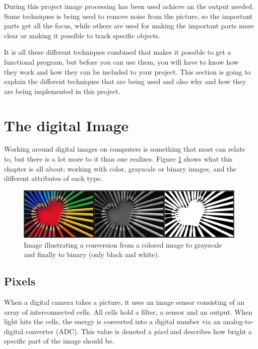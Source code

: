 During this project image processing has been used achieve an the output needed. Some techniques is being used to remove noise from the picture, so the important parts get all the focus, while others are used for making the important parts more clear or making it possible to track specific objects.

It is all these different techniques combined that makes it possible to get a functional program, but before you can use them, you will have to know how they work and how they can be included to your project. This section is going to explain the different techniques that are being used and also why and how they are being implemented in this project.

\section{The digital Image}
Working around digital images on computers is something that most can relate to, but there is a lot more to it than one realizes. Figure \ref{fig:ip_ColoredToGrayscaleToBinary} shows what this chapter is all about; working with color, grayscale or binary images, and the different attributes of each type.

\begin{figure}[htbp]
\centering
\includegraphics[width=1.00\textwidth]{Pictures/Theory/ColoredToGrayscaleToBinary.jpg}
\caption{Image illustrating a conversion from a colored image to grayscale and finally to binary (only black and white).}
\label{fig:ip_ColoredToGrayscaleToBinary}
\end{figure}

\subsection{Pixels}
When a digital camera takes a picture, it uses an image sensor consisting of an array of interconnected cells. All cells hold a filter, a sensor and an output. When light hits the cells, the energy is converted into a digital number via an analog-to-digital converter (ADC). This value is denoted a \textit{pixel} and describes how bright a specific part of the image should be. \citep{ip_book}

